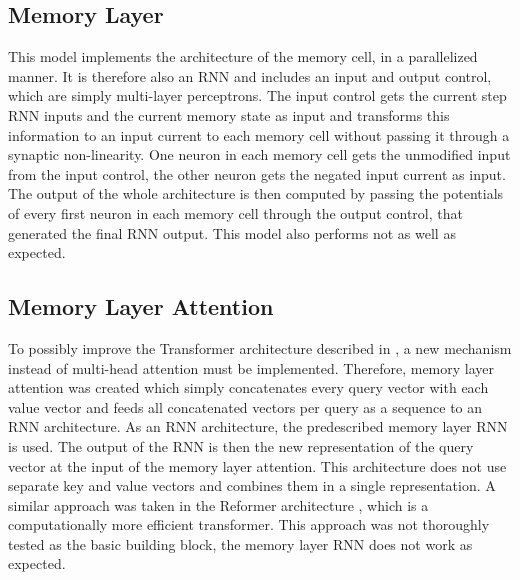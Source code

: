 \documentclass[draft,final]{vutinfth} %
\begin{document}
    \subsection{Memory Layer} \label{Memory Layer}
    This model implements the architecture of the memory cell, in a parallelized manner. It is therefore also an RNN and includes an input and output control, which are simply multi-layer perceptrons.
    The input control gets the current step RNN inputs and the current memory state as input and transforms this information to an input current to each memory cell without passing it through a synaptic non-linearity.
    One neuron in each memory cell gets the unmodified input from the input control, the other neuron gets the negated input current as input.
    The output of the whole architecture is then computed by passing the potentials of every first neuron in each memory cell through the output control, that generated the final RNN output.
    This model also performs not as well as expected.

    \subsection{Memory Layer Attention} \label{Memory Layer Attention}
    To possibly improve the Transformer architecture described in \cite{Transformer}, a new mechanism instead of multi-head attention must be implemented.
    Therefore, memory layer attention was created which simply concatenates every query vector with each value vector and feeds all concatenated vectors per query as a sequence to an RNN architecture.
    As an RNN architecture, the predescribed memory layer RNN is used. The output of the RNN is then the new representation of the query vector at the input of the memory layer attention.
    This architecture does not use separate key and value vectors and combines them in a single representation.
    A similar approach was taken in the Reformer architecture \cite{Reformer}, which is a computationally more efficient transformer.
    This approach was not thoroughly tested as the basic building block, the memory layer RNN does not work as expected.
\end{document}
